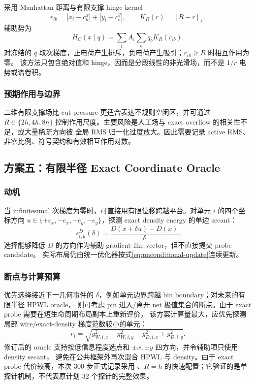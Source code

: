 \documentclass[UTF8,a4paper,11pt]{ctexart}
\DeclareRobustCommand{\code}[1]{\texttt{\detokenize{#1}}}
\newcommand{\pos}[1]{\left[#1\right]_{+}}
\begin{document}
采用 Manhattan 距离与有限支撑 hinge kernel
\begin{equation}
  r_{ib}=|x_i-c_b^x|+|y_i-c_b^y|,
  \qquad K_R(r)=\pos{R-r}.
\end{equation}
辅助势为
\begin{equation}
  H_C(x\mid q)=\sum_iA_i\sum_bq_bK_R(r_{ib}).
  \label{eq:charge-potential}
\end{equation}
对冻结的 $q$ 取次梯度，正电荷产生排斥，负电荷产生吸引；$r_{ib}\ge R$ 时相互作用为零。
该方法只包含绝对值和 hinge，因而是分段线性的非光滑场，而不是 $1/r$ 电势或谱卷积。

\subsubsection{预期作用与边界}

二维有限支撑场比 cut pressure 更适合表达不规则空闲区，并可通过
$R\in\{2h,4h,8h\}$ 控制作用尺度。主要风险是人工场与 exact overflow 的相关性不足，或大量稀疏方向被
全局 RMS 归一化过度放大。因此需要记录 active RMS、非零比例、符号契约和有效相互作用对数。

\subsection{方案五：有限半径 Exact Coordinate Oracle}

\subsubsection{动机}

当 infinitesimal 次梯度为零时，可直接用有限位移跨越平台。对单元 $i$ 的四个坐标方向
$u\in\{+e_x,-e_x,+e_y,-e_y\}$，探测 exact density energy 的单边 secant：
\begin{equation}
  s_{i,u}^{D}(\delta)=
  \frac{D(x+\delta u)-D(x)}{\delta}.
  \label{eq:finite-secant}
\end{equation}
选择能够降低 $D$ 的方向作为辅助 gradient-like vector，但不直接提交 probe candidate。
实际布局仍由统一优化器按式\eqref{eq:unconditional-update}连续更新。

\subsubsection{断点与计算预算}

优先选择接近下一几何事件的 $\delta$，例如单元边界跨越 bin boundary；对未来的有限半径 HPWL oracle，
则可考虑 pin 进入/离开 net 极值集合的断点。由于 exact probe 需要在短生命周期布局副本上重新评价，
该方案计算量最大，应优先探测局部 wire/exact-density 梯度范数较小的单元：
\begin{equation}
  r_i=\sqrt{g_{W,i,x}^2+g_{W,i,y}^2+g_{D,i,x}^2+g_{D,i,y}^2}.
\end{equation}
修订后的 oracle 支持按低信息程度选点和 $\pm x,\pm y$ 四方向，并令辅助项只使用 density secant，
避免在公共框架外再次混合 HPWL 与 density。由于 exact probe 代价较高，本次 300 步正式记录采用
\code{probe_count=1}、$R=h$ 的快速配置；它验证的是单探针机制，不代表原计划 32 个探针的完整效果。
\end{document}
